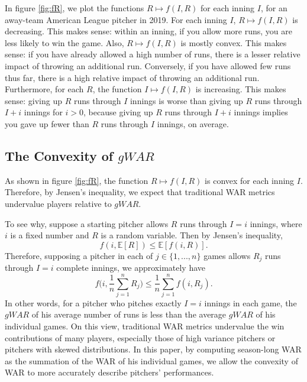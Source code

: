 \documentclass[12pt]{article}
\newcommand{\E}{{\mathbb E}}
\begin{document}
In figure \ref{fig:fR}, we plot the functions $R \mapsto f(I,R)$ for each inning $I$, for an away-team American League pitcher in 2019. For each inning $I$, $R \mapsto f(I,R)$ is decreasing. This makes sense: within an inning, if you allow more runs, you are less likely to win the game. Also, $R \mapsto f(I,R)$ is mostly convex. This makes sense: if you have already allowed a high number of runs, there is a lesser relative impact of throwing an additional run. Conversely, if you have allowed few runs thus far, there is a high relative impact of throwing an additional run. Furthermore, for each $R$, the function $I \mapsto f(I,R)$ is increasing. This makes sense: giving up $R$ runs through $I$ innings is worse than giving up $R$ runs through $I+i$ innings for $i > 0$, because giving up $R$ runs through $I+i$ innings implies you gave up fewer than $R$ runs through $I$ innings, on average.

\subsection{The Convexity of $gWAR$}\label{sec:convexityOfWAR}

As shown in figure \ref{fig:fR}, the function $R \mapsto f(I,R)$ is convex for each inning $I$. Therefore, by Jensen's inequality, we expect that traditional WAR metrics undervalue players relative to $gWAR$. 

To see why, suppose a starting pitcher allows $R$ runs through $I = i$ innings, where $i$ is a fixed number and $R$ is a random variable. Then by Jensen's inequality, 
\begin{equation}
f(i, \E[R]) \leq \E[f(i,R)].
\label{eqn:jensen1}
\end{equation}
Therefore, supposing a pitcher in each of $j \in \{1,...,n\}$ games allows $R_j$ runs through $I=i$ complete innings, we approximately have
\begin{equation}
f\bigg(i, \frac{1}{n}\sum_{j=1}^{n} R_j\bigg) \leq \frac{1}{n}\sum_{j=1}^{n} f(i,R_j).
\label{eqn:jensen2}
\end{equation}
In other words, for a pitcher who pitches exactly $I=i$ innings in each game, the $gWAR$ of his average number of runs is less than the average $gWAR$ of his individual games. On this view, traditional WAR metrics undervalue the win contributions of many players, especially those of high variance pitchers or pitchers with skewed distributions. In this paper, by computing season-long WAR as the summation of the WAR of his individual games, we allow the convexity of WAR to more accurately describe pitchers' performances. 
\end{document}
